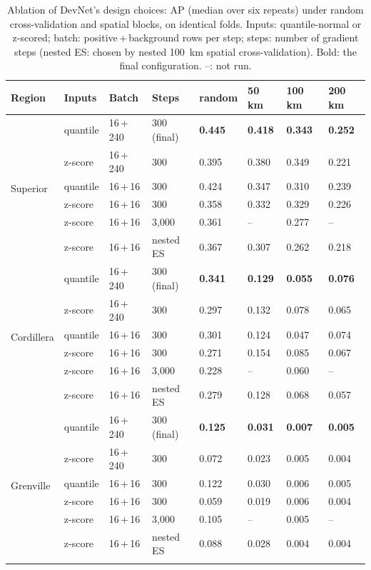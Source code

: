 \documentclass[pdflatex,sn-apa]{sn-jnl}
\begin{document}
\begin{appendices}
\begin{table}[!h]
\caption{Ablation of DevNet's design choices: AP (median over six repeats) under random cross-validation and spatial blocks, on identical folds. Inputs: quantile-normal or z-scored; batch: positive\,+\,background rows per step; steps: number of gradient steps (nested ES: chosen by nested 100~km spatial cross-validation). Bold: the final configuration. --: not run.}\label{tab:ablation}
\scriptsize
\setlength{\tabcolsep}{2.5pt}
\begin{tabular*}{\textwidth}{@{\extracolsep\fill}llllllll}
\toprule
Region & Inputs & Batch & Steps & random & 50 km & 100 km & 200 km \\
\midrule
\multirow{6}{*}{Superior} & quantile & 16\,+\,240 & 300 (final) & \textbf{0.445} & \textbf{0.418} & \textbf{0.343} & \textbf{0.252} \\
 & z-score & 16\,+\,240 & 300 & 0.395 & 0.380 & 0.349 & 0.221 \\
 & quantile & 16\,+\,16 & 300 & 0.424 & 0.347 & 0.310 & 0.239 \\
 & z-score & 16\,+\,16 & 300 & 0.358 & 0.332 & 0.329 & 0.226 \\
 & z-score & 16\,+\,16 & 3,000 & 0.361 & -- & 0.277 & -- \\
 & z-score & 16\,+\,16 & nested ES & 0.367 & 0.307 & 0.262 & 0.218 \\
\midrule
\multirow{6}{*}{Cordillera} & quantile & 16\,+\,240 & 300 (final) & \textbf{0.341} & \textbf{0.129} & \textbf{0.055} & \textbf{0.076} \\
 & z-score & 16\,+\,240 & 300 & 0.297 & 0.132 & 0.078 & 0.065 \\
 & quantile & 16\,+\,16 & 300 & 0.301 & 0.124 & 0.047 & 0.074 \\
 & z-score & 16\,+\,16 & 300 & 0.271 & 0.154 & 0.085 & 0.067 \\
 & z-score & 16\,+\,16 & 3,000 & 0.228 & -- & 0.060 & -- \\
 & z-score & 16\,+\,16 & nested ES & 0.279 & 0.128 & 0.068 & 0.057 \\
\midrule
\multirow{6}{*}{Grenville} & quantile & 16\,+\,240 & 300 (final) & \textbf{0.125} & \textbf{0.031} & \textbf{0.007} & \textbf{0.005} \\
 & z-score & 16\,+\,240 & 300 & 0.072 & 0.023 & 0.005 & 0.004 \\
 & quantile & 16\,+\,16 & 300 & 0.122 & 0.030 & 0.006 & 0.005 \\
 & z-score & 16\,+\,16 & 300 & 0.059 & 0.019 & 0.006 & 0.004 \\
 & z-score & 16\,+\,16 & 3,000 & 0.105 & -- & 0.005 & -- \\
 & z-score & 16\,+\,16 & nested ES & 0.088 & 0.028 & 0.004 & 0.004 \\
\botrule
\end{tabular*}
\end{table}


\end{appendices}
\end{document}
